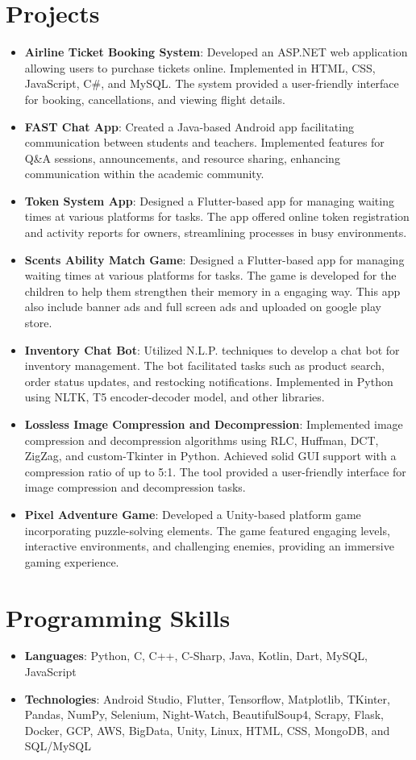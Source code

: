 \documentclass[letterpaper,10pt]{article}
\newcommand{\resumeItem}[2]{
  \item\small{
    \textbf{#1}{: #2 \vspace{-2pt}}
  }
}
\newcommand{\resumeSubItem}[2]{\resumeItem{#1}{#2}\vspace{-4pt}}
\newcommand{\resumeSubHeadingListStart}{\begin{itemize}[leftmargin=*]}
\newcommand{\resumeSubHeadingListEnd}{\end{itemize}}
\begin{document}
\section{Projects}
\resumeSubHeadingListStart
\resumeSubItem{Airline Ticket Booking System}
{Developed an ASP.NET web application allowing users to purchase tickets online. Implemented in HTML, CSS, JavaScript, C\#, and MySQL. The system provided a user-friendly interface for booking, cancellations, and viewing flight details.}
\resumeSubItem{FAST Chat App}
{Created a Java-based Android app facilitating communication between students and teachers. Implemented features for Q\&A sessions, announcements, and resource sharing, enhancing communication within the academic community.}
\resumeSubItem{Token System App}
{Designed a Flutter-based app for managing waiting times at various platforms for tasks. The app offered online token registration and activity reports for owners, streamlining processes in busy environments.}
\resumeSubItem{Scents Ability Match Game}
{Designed a Flutter-based app for managing waiting times at various platforms for tasks. The game is developed for the children to help them strengthen their memory in a engaging way. This app also include banner ads and full screen ads and uploaded on google play store.}
\resumeSubItem{Inventory Chat Bot}
{Utilized N.L.P. techniques to develop a chat bot for inventory management. The bot facilitated tasks such as product search, order status updates, and restocking notifications. Implemented in Python using NLTK, T5 encoder-decoder model, and other libraries.}
\resumeSubItem{Lossless Image Compression and Decompression}
{Implemented image compression and decompression algorithms using RLC, Huffman, DCT, ZigZag, and custom-Tkinter in Python. Achieved solid GUI support with a compression ratio of up to 5:1. The tool provided a user-friendly interface for image compression and decompression tasks.}
\resumeSubItem{Pixel Adventure Game}
{Developed a Unity-based platform game incorporating puzzle-solving elements. The game featured engaging levels, interactive environments, and challenging enemies, providing an immersive gaming experience.}
\resumeSubHeadingListEnd

%
\section{Programming Skills}
 \resumeSubHeadingListStart
    \resumeSubItem {Languages}
    {Python, C, C++, C-Sharp, Java, Kotlin, Dart, MySQL, JavaScript}
    \resumeSubItem {Technologies}
    {Android Studio, Flutter, Tensorflow, Matplotlib, TKinter, Pandas, NumPy, Selenium, Night-Watch, BeautifulSoup4, Scrapy, Flask, Docker, GCP, AWS, BigData, Unity, Linux, HTML, CSS, MongoDB, and SQL/MySQL}
 \resumeSubHeadingListEnd

\end{document}
